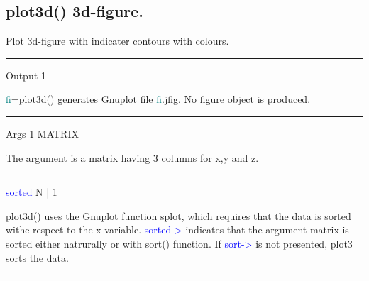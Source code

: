\subsection{\textcolor{VioletRed}{plot3d}() 3d-figure.}
\label{plot3d}
Plot 3d-figure with indicater contours  with colours.
\vspace{0.3cm}
\hrule
\vspace{0.3cm}
\noindent Output  \tabto{3cm}  1   \tabto{5cm}    \tabto{7cm}
\begin{changemargin}{3cm}{0cm}
\noindent  \textcolor{teal}{fi}=\textcolor{VioletRed}{plot3d}() generates Gnuplot file \textcolor{teal}{fi}.jfig.
No figure object is produced.
\end{changemargin}
\vspace{0.3cm}
\hrule
\vspace{0.3cm}
\noindent Args \tabto{3cm}  1  \tabto{5cm}   MATRIX  \tabto{7cm}
\begin{changemargin}{3cm}{0cm}
\noindent  The argument is a matrix having 3 columns for x,y and z.
\end{changemargin}
\vspace{0.3cm}
\hrule
\vspace{0.3cm}
\noindent \textcolor{blue}{sorted}  \tabto{3cm}  N | 1  \tabto{5cm}    \tabto{7cm}
\begin{changemargin}{3cm}{0cm}
\noindent \textcolor{VioletRed}{plot3d}() uses the Gnuplot function splot, which requires that the data
is sorted withe respect to the x-variable. \textcolor{blue}{sorted->} indicates that the argument matrix is sorted
either natrurally or with \textcolor{VioletRed}{sort}() function. If \textcolor{blue}{sort->} is not presented, plot3
sorts the data.
\end {changemargin}
\hrule
\vspace{0.2cm}
